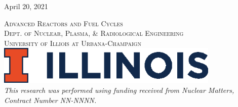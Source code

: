 \begin{titlepage}
    
    \vspace{0.5cm} %
    {\large April 20, 2021} %
    \vspace{0.5cm}

    
    \textsc{\LARGE Advanced Reactors and Fuel Cycles}\\[0.25cm] %
    
    \textsc{\large Dept. of Nuclear, Plasma, \& Radiological Engineering}\\%
    
    \textsc{\large University of Illiois at Urbana-Champaign}\\ %


    
    
    \vspace{0.5cm}
    \includegraphics[width=0.8\textwidth]{./img/illinois.eps}\\[1cm] %
     

    \textit{This research was performed using funding received from Nuclear 
    Matters, Contract Number NN-NNNN.} 

\end{titlepage}













